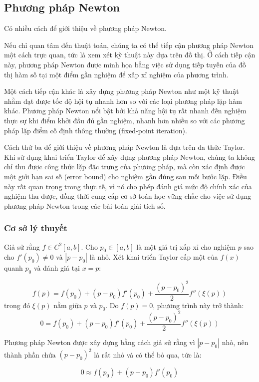 \subsection{Phương pháp Newton}

Có nhiều cách để giới thiệu về phương pháp Newton.

Nếu chỉ quan tâm đến thuật toán, chúng ta có thể tiếp cận phương pháp Newton một cách trực quan, tức là xem xét kỹ thuật này dựa trên đồ thị. Ở cách tiếp cận này, phương pháp Newton được minh họa bằng việc sử dụng tiếp tuyến của đồ thị hàm số tại một điểm gần nghiệm để xấp xỉ nghiệm của phương trình.

Một cách tiếp cận khác là xây dựng phương pháp Newton như một kỹ thuật nhằm đạt được tốc độ hội tụ nhanh hơn so với các loại phương pháp lặp hàm khác. Phương pháp Newton nổi bật bởi khả năng hội tụ rất nhanh đến nghiệm thực sự khi điểm khởi đầu đủ gần nghiệm, nhanh hơn nhiều so với các phương pháp lặp điểm cố định thông thường (fixed-point iteration).

Cách thứ ba để giới thiệu về phương pháp Newton là dựa trên đa thức Taylor. Khi sử dụng khai triển Taylor để xây dựng phương pháp Newton, chúng ta không chỉ thu được công thức lặp đặc trưng của phương pháp, mà còn xác định được một giới hạn sai số (error bound) cho nghiệm gần đúng sau mỗi bước lặp. Điều này rất quan trọng trong thực tế, vì nó cho phép đánh giá mức độ chính xác của nghiệm thu được, đồng thời cung cấp cơ sở toán học vững chắc cho việc sử dụng phương pháp Newton trong các bài toán giải tích số.
\subsubsection*{Cơ sở lý thuyết}

{Giả sử rằng $f \in C^2[a, b]$.} Cho $p_0 \in [a, b]$ là một giá trị xấp xỉ cho nghiệm $p$ sao cho $f'(p_0) \neq 0$ và $|p - p_0|$ là nhỏ. Xét khai triển Taylor cấp một của $f(x)$ quanh $p_0$ và đánh giá tại $x = p$:

$$f(p) = f(p_0) + (p - p_0) f'(p_0) + \frac{(p - p_0)^2}{2} f''(\xi(p))$$
trong đó $\xi(p)$ nằm giữa $p$ và $p_0$. Do $f(p) = 0$, phương trình này trở thành:
$$0 = f(p_0) + (p - p_0) f'(p_0) + \frac{(p - p_0)^2}{2} f''(\xi(p))$$

Phương pháp Newton được xây dựng bằng cách giả sử rằng vì $|p - p_0|$ nhỏ, nên thành phần chứa $(p - p_0)^2$ là rất nhỏ và có thể bỏ qua, tức là:

$$0 \approx f(p_0) + (p - p_0) f'(p_0)$$

